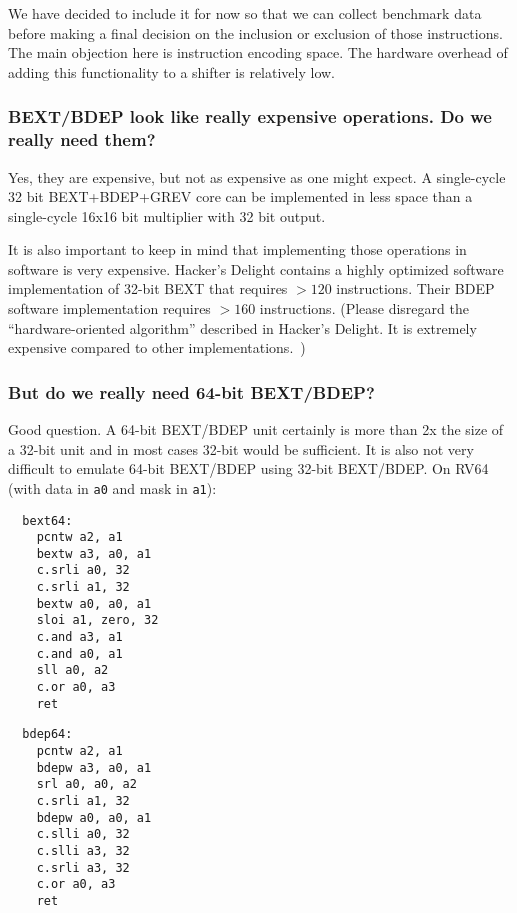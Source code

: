 We have decided to include it for now so that we can collect benchmark data
before making a final decision on the inclusion or exclusion of those
instructions. The main objection here is instruction encoding space. The
hardware overhead of adding this functionality to a shifter is relatively low.

\subsubsection{BEXT/BDEP look like really expensive operations. Do we really need them?}

Yes, they are expensive, but not as expensive as one might expect. A
single-cycle 32 bit BEXT+BDEP+GREV core can be implemented in less space than a
single-cycle 16x16 bit multiplier with 32 bit output.~\cite{Wolf17B}

It is also important to keep in mind that implementing those operations in
software is very expensive. Hacker's Delight contains a highly optimized
software implementation of 32-bit BEXT that requires $>120$ instructions. Their
BDEP software implementation requires $>160$ instructions. (Please disregard the
``hardware-oriented algorithm'' described in Hacker's Delight. It is
extremely expensive compared to other implementations.~\cite{Wolf17B})

\subsubsection{But do we really need 64-bit BEXT/BDEP?}

Good question. A 64-bit BEXT/BDEP unit certainly is more than 2x the size of a
32-bit unit and in most cases 32-bit would be sufficient. It is also not very difficult
to emulate 64-bit BEXT/BDEP using 32-bit BEXT/BDEP. On RV64 (with data in {\tt a0} and
mask in {\tt a1}):

\begin{multicols}{2}
\begin{minipage}{\linewidth}
\begin{verbatim}
  bext64:
    pcntw a2, a1
    bextw a3, a0, a1
    c.srli a0, 32
    c.srli a1, 32
    bextw a0, a0, a1
    sloi a1, zero, 32
    c.and a3, a1
    c.and a0, a1
    sll a0, a2
    c.or a0, a3
    ret
\end{verbatim}
\end{minipage}

\begin{minipage}{\linewidth}
\begin{verbatim}
  bdep64:
    pcntw a2, a1
    bdepw a3, a0, a1
    srl a0, a0, a2
    c.srli a1, 32
    bdepw a0, a0, a1
    c.slli a0, 32
    c.slli a3, 32
    c.srli a3, 32
    c.or a0, a3
    ret
\end{verbatim}
\end{minipage}
\end{multicols}

